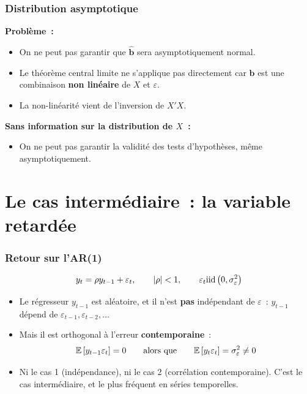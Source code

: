 \documentclass[10pt]{beamer}
\begin{document}
\begin{frame}
  \frametitle{Distribution asymptotique}

  \textbf{Problème~:}
  \begin{itemize}

  \item On ne peut pas garantir que $\hat{\mathbf b}$ sera asymptotiquement
    normal.\newline

  \item Le théorème central limite ne s'applique pas directement
    car $\hat{\mathbf b}$ est une combinaison \textbf{non linéaire}
    de $X$ et $\varepsilon$.\newline

  \item La non-linéarité vient de l'inversion de $X'X$.\newline

  \end{itemize}

  \medskip

  \textbf{Sans information sur la distribution de $X$~:}
  \begin{itemize}
  \item On ne peut pas garantir la validité des tests d'hypothèses, même
    asymptotiquement.
  \end{itemize}

\end{frame}


\section{Le cas intermédiaire~: la variable retardée}

\begin{frame}
  \frametitle{Retour sur l'AR(1)}

  \[ y_t = \rho y_{t-1} + \varepsilon_t, \qquad |\rho|<1, \qquad \varepsilon_t \mathrm{iid}\left(0,\sigma_{\varepsilon}^2\right) \]

  \begin{itemize}

  \item Le régresseur $y_{t-1}$ est aléatoire, et il n'est \textbf{pas}
    indépendant de $\varepsilon$~: $y_{t-1}$ dépend
    de $\varepsilon_{t-1}, \varepsilon_{t-2}, \ldots$\newline

  \item Mais il est orthogonal à l'erreur \textbf{contemporaine}~:
    \[
      \mathbb E\left[ y_{t-1}\varepsilon_t \right] = 0
      \qquad\text{alors que}\qquad
      \mathbb E\left[ y_{t}\varepsilon_t \right] = \sigma_{\varepsilon}^2 \neq 0
    \]

  \item[$\Rightarrow$] Ni le cas 1 (indépendance), ni le cas 2 (corrélation
    contemporaine). C'est le cas intermédiaire, et le plus fréquent en séries
    temporelles.

  \end{itemize}

\end{frame}
\end{document}

